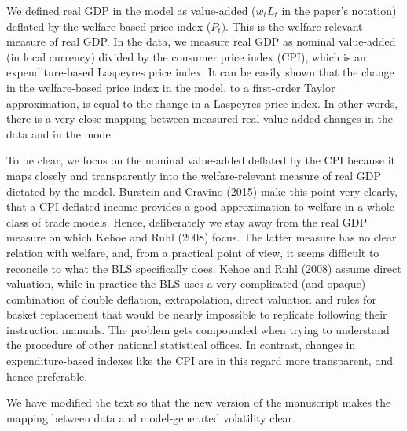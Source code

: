 We defined real GDP in the model as value-added ($w_{t}L_{t}$ in the paper's
notation) deflated by the welfare-based price index ($P_{t})$. This is the
welfare-relevant measure of real GDP. In the data, we measure real GDP as
nominal value-added (in local currency) divided by the consumer price index
(CPI), which is an expenditure-based Laspeyres price index. It can be easily
shown that the change in the welfare-based price index in the model, to a
first-order Taylor approximation, is equal to the change in a Laspeyres
price index. In other words, there is a very close mapping between measured
real value-added changes in the data and in the model.

To be clear, we focus on the nominal value-added deflated by the CPI because
it maps closely and transparently into the welfare-relevant measure of real
GDP dictated by the model. Burstein and Cravino (2015) make this point very clearly, that a CPI-deflated income provides a good approximation to welfare in a whole class of trade models.
Hence, deliberately we stay away from the real
GDP measure on which Kehoe and Ruhl (2008) focus. The latter measure has no
clear relation with welfare, and, from a practical point of view, it seems difficult to reconcile to what the BLS specifically does. Kehoe and Ruhl (2008)
assume direct valuation, while in practice the BLS uses a very complicated
(and opaque) combination of double deflation, extrapolation, direct
valuation and rules for basket replacement that would be nearly impossible
to replicate following their instruction manuals. The problem gets
compounded when trying to understand the procedure of other national
statistical offices. In contrast, changes in expenditure-based indexes like
the CPI are in this regard more transparent, and hence preferable.

We have modified the text so that the new version of the manuscript makes
the mapping between data and model-generated volatility clear.

